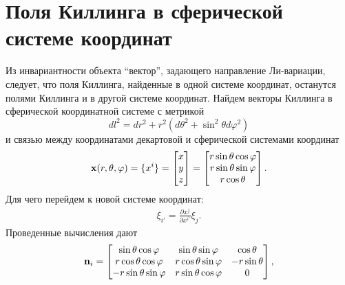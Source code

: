\documentclass[12pt,a4paper]{article}
\begin{document}

    \section{Поля Киллинга в сферической системе координат}

        Из инвариантности объекта \enquote{вектор}, задающего направление Ли-вариации, следует, что поля Киллинга, найденные в одной системе координат, останутся полями Киллинга и в другой системе координат. Найдем векторы Киллинга в сферической координатной системе с метрикой
        \begin{equation}
            dl^2 = dr^2 + r^2 (d\theta^2 + \sin ^2 \theta d\varphi^2)
        \end{equation}
        и связью между координатами декартовой и сферической системами координат
        \begin{equation}
            \mathbf{x}(r, \theta, \varphi)
            =
            \{x^i\}
            =
            \begin{bmatrix}
                x \\ y \\ z
            \end{bmatrix}
            =
            \begin{bmatrix}
                r \sin\theta \cos\varphi \\
                r \sin\theta \sin\varphi \\
                r \cos\theta
            \end{bmatrix}
            .
        \end{equation}
        Для чего перейдем к новой системе координат:
        \begin{equation}\begin{aligned}
            \xi_{i'} = \frac{\partial x^j}{\partial x^{i'}} \xi_j.
        \end{aligned}\end{equation}
        Проведенные вычисления дают
        \begin{equation}
            \mathbf{n}_i
            =
            \begin{bmatrix}
                \sin\theta \cos\varphi     & \sin\theta \sin\varphi   & \cos\theta \\
                r \cos\theta \cos\varphi   & r \cos\theta \sin\varphi & - r \sin\theta \\
                - r \sin\theta \sin\varphi & r \sin\theta \cos\varphi & 0
            \end{bmatrix}
            ,
        \end{equation}
\end{document}
